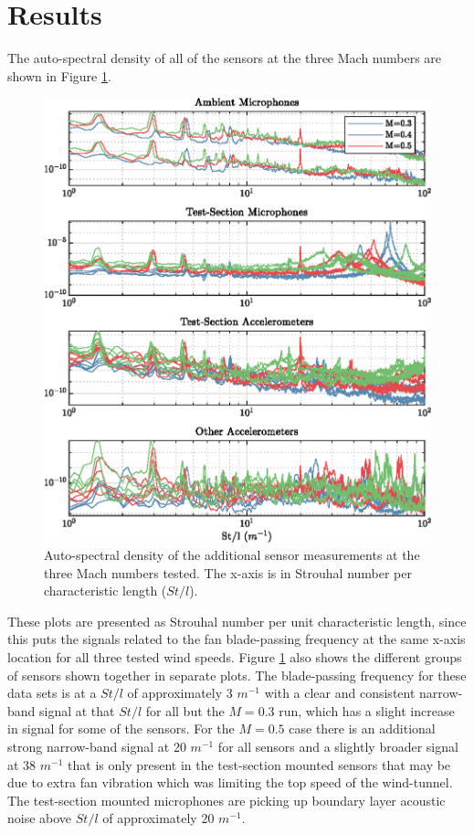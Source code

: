 \section{Results}
The auto-spectral density of all of the sensors at the three Mach numbers are shown in Figure \ref{fig:07_sensor_spectra}.
\begin{figure}
  \centering
  \includegraphics{../matlab/07_multiple_sensor_filtering/sensor_spectra.eps}
  \caption{Auto-spectral density of the additional sensor measurements at the three Mach numbers tested. The x-axis is in Strouhal number per characteristic length ($St/l$).}
  \label{fig:07_sensor_spectra}
\end{figure}
These plots are presented as Strouhal number per unit characteristic length, since this puts the signals related to the fan blade-passing frequency at the same x-axis location for all three tested wind speeds.
Figure \ref{fig:07_sensor_spectra} also shows the different groups of sensors shown together in separate plots.
The blade-passing frequency for these data sets is at a $St/l$ of approximately 3 $m^{-1}$ with a clear and consistent narrow-band signal at that $St/l$ for all but the $M=0.3$ run, which has a slight increase in signal for some of the sensors.
For the $M=0.5$ case there is an additional strong narrow-band signal at 20 $m^{-1}$ for all sensors and a slightly broader signal at 38 $m^{-1}$ that is only present in the test-section mounted sensors that may be due to extra fan vibration which was limiting the top speed of the wind-tunnel.
The test-section mounted microphones are picking up boundary layer acoustic noise above $St/l$ of approximately 20 $m^{-1}$.

